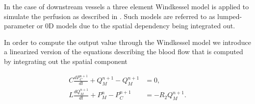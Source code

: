 \documentclass[a4paper, oneside]{discothesis}
\begin{document}
	In the case of downstream vessels a three element Windkessel model is applied to simulate the perfusion as described in \cite{CiCP-4-317}.
	Such models are referred to as lumped-parameter or 0D models due to the spatial dependency being integrated out.

	In order to compute the output value through the Windkessel model we introduce a linearized version of the equations describing the blood flow that is computed by integrating out the spatial component

	\begin{align}
		C\frac{d P_C^{n+1}}{d t}+Q_{M}^{n+1}-Q_M^{n+1}&=0, \label{eq:RLC1}\\
		{L}{\frac{d Q_M^{n+1}}{d t}}+P_{M}^n-P_C^{n+1}&=-R_2 Q_{M}^{n+1} \label{eq:RLC2}.
	\end{align}
\end{document}
